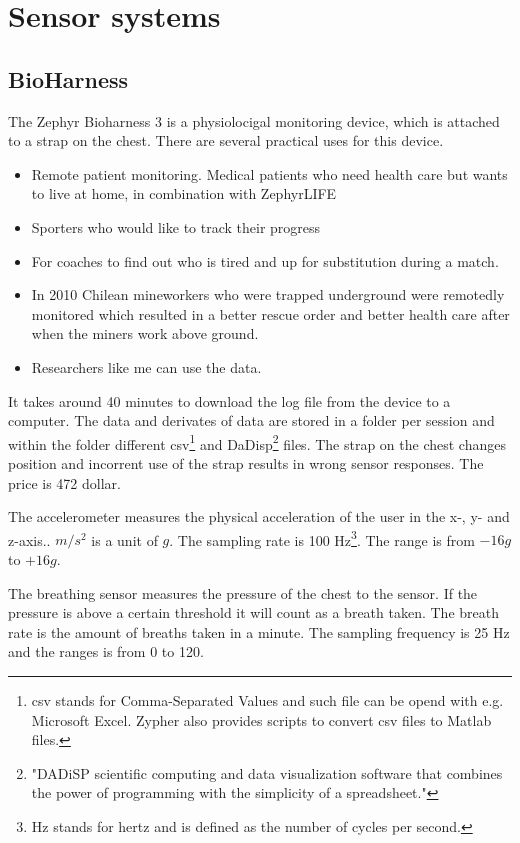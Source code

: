 \section{Sensor systems}
	\subsection{BioHarness}
			The Zephyr Bioharness 3\cite{bioharness} is a physiolocigal monitoring device, which is attached to a strap on the chest. There are several practical uses for this device.
			\begin{itemize}
				\item Remote patient monitoring. Medical patients who need health care but wants to live at home, in combination with ZephyrLIFE \texttrademark \cite{bhpatients}
				\item Sporters who would like to track their progress 
				\item For coaches to find out who is tired and up for substitution during a match. \cite{bhsport}
				\item In 2010 Chilean mineworkers who were trapped underground were remotedly monitored which resulted in a better rescue order and better health care after when the miners work above ground. \cite{chile}
				\item Researchers like me can use the data.
			\end{itemize}
			It takes around 40 minutes to download the log file from the device to a computer. \cite{bhdatasheet} The data and derivates of data are stored in a folder per session and within the folder different csv\footnote{csv stands for Comma-Separated Values and such file can be opend with e.g. Microsoft Excel. Zypher also provides scripts to convert csv files to Matlab files.} and DaDisp\footnote{"DADiSP scientific computing and data visualization software that combines the power of programming with the simplicity of a spreadsheet."\cite{dadisp}} files. The strap on the chest changes position and incorrent use of the strap results in wrong sensor responses.
			The price is 472 dollar.
		
			The accelerometer measures the physical acceleration of the user in the x-, y- and z-axis.. $m/s^2$ is a unit of $g$. The sampling rate is 100 Hz\footnote{Hz stands for hertz and is defined as the number of cycles per second.}. The range is from $-16g$ to $+16g$.

			The breathing sensor measures the pressure of the chest to the sensor. If the pressure is above a certain threshold it will count as a breath taken. The breath rate is the amount of breaths taken in a minute. The sampling frequency is 25 Hz and the ranges is from 0 to 120.

